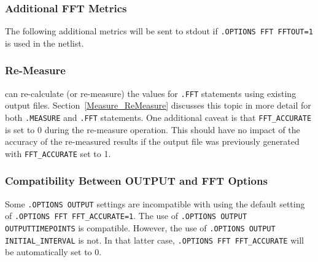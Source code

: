 \subsubsection{Additional FFT Metrics}
\label{FFT_metrics}
The following additional metrics will be sent to stdout if
\texttt{.OPTIONS FFT FFTOUT=1} is used in the netlist.

\subsubsection{Re-Measure}
\label{Measure_FFT_ReMeasure}
\Xyce{} can re-calculate (or re-measure) the values for {\tt .FFT} statements
using existing \Xyce{} output files.  Section~\ref{Measure_ReMeasure} discusses
this topic in more detail for both {\tt .MEASURE} and {\tt .FFT} statements. One
additional caveat is that \texttt{FFT\_ACCURATE} is set to 0 during the re-measure
operation.  This should have no impact of the accuracy of the re-measured results
if the output file was previously generated with \texttt{FFT\_ACCURATE} set to 1.

\subsubsection{Compatibility Between OUTPUT and FFT Options}
Some \texttt{.OPTIONS OUTPUT} settings are incompatible with using the default
setting of \texttt{.OPTIONS FFT FFT\_ACCURATE=1}.  The use of
\texttt{.OPTIONS OUTPUT OUTPUTTIMEPOINTS} is compatible.  However, the use of
\texttt{.OPTIONS OUTPUT INITIAL\_INTERVAL} is not.  In that latter case,
\texttt{.OPTIONS FFT FFT\_ACCURATE} will be automatically set to 0.
